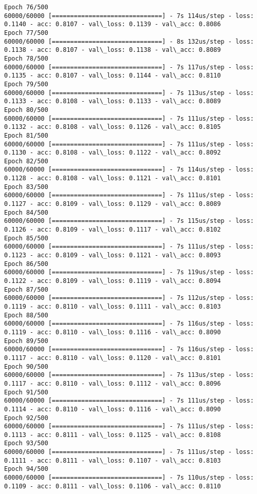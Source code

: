 \documentclass[11pt]{article}
\begin{document}
\begin{Verbatim}[commandchars=\\\{\}]
Epoch 76/500
60000/60000 [==============================] - 7s 114us/step - loss: 0.1140 - acc: 0.8107 - val\_loss: 0.1139 - val\_acc: 0.8086
Epoch 77/500
60000/60000 [==============================] - 8s 132us/step - loss: 0.1138 - acc: 0.8107 - val\_loss: 0.1138 - val\_acc: 0.8089
Epoch 78/500
60000/60000 [==============================] - 7s 117us/step - loss: 0.1135 - acc: 0.8107 - val\_loss: 0.1144 - val\_acc: 0.8110
Epoch 79/500
60000/60000 [==============================] - 7s 113us/step - loss: 0.1133 - acc: 0.8108 - val\_loss: 0.1133 - val\_acc: 0.8089
Epoch 80/500
60000/60000 [==============================] - 7s 111us/step - loss: 0.1132 - acc: 0.8108 - val\_loss: 0.1126 - val\_acc: 0.8105
Epoch 81/500
60000/60000 [==============================] - 7s 111us/step - loss: 0.1130 - acc: 0.8108 - val\_loss: 0.1122 - val\_acc: 0.8092
Epoch 82/500
60000/60000 [==============================] - 7s 114us/step - loss: 0.1128 - acc: 0.8108 - val\_loss: 0.1121 - val\_acc: 0.8101
Epoch 83/500
60000/60000 [==============================] - 7s 111us/step - loss: 0.1127 - acc: 0.8109 - val\_loss: 0.1129 - val\_acc: 0.8089
Epoch 84/500
60000/60000 [==============================] - 7s 115us/step - loss: 0.1126 - acc: 0.8109 - val\_loss: 0.1117 - val\_acc: 0.8102
Epoch 85/500
60000/60000 [==============================] - 7s 111us/step - loss: 0.1123 - acc: 0.8109 - val\_loss: 0.1121 - val\_acc: 0.8093
Epoch 86/500
60000/60000 [==============================] - 7s 119us/step - loss: 0.1122 - acc: 0.8109 - val\_loss: 0.1119 - val\_acc: 0.8094
Epoch 87/500
60000/60000 [==============================] - 7s 112us/step - loss: 0.1119 - acc: 0.8110 - val\_loss: 0.1111 - val\_acc: 0.8103
Epoch 88/500
60000/60000 [==============================] - 7s 116us/step - loss: 0.1119 - acc: 0.8110 - val\_loss: 0.1116 - val\_acc: 0.8090
Epoch 89/500
60000/60000 [==============================] - 7s 116us/step - loss: 0.1117 - acc: 0.8110 - val\_loss: 0.1120 - val\_acc: 0.8101
Epoch 90/500
60000/60000 [==============================] - 7s 113us/step - loss: 0.1117 - acc: 0.8110 - val\_loss: 0.1112 - val\_acc: 0.8096
Epoch 91/500
60000/60000 [==============================] - 7s 111us/step - loss: 0.1114 - acc: 0.8110 - val\_loss: 0.1116 - val\_acc: 0.8090
Epoch 92/500
60000/60000 [==============================] - 7s 111us/step - loss: 0.1113 - acc: 0.8111 - val\_loss: 0.1125 - val\_acc: 0.8108
Epoch 93/500
60000/60000 [==============================] - 7s 111us/step - loss: 0.1111 - acc: 0.8111 - val\_loss: 0.1107 - val\_acc: 0.8103
Epoch 94/500
60000/60000 [==============================] - 7s 110us/step - loss: 0.1109 - acc: 0.8111 - val\_loss: 0.1106 - val\_acc: 0.8110

\end{Verbatim}
\end{document}
